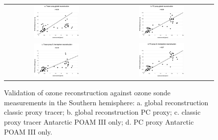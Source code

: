 \begin{figure}
  \centering
  \begin{tabular}{cc}
  \includegraphics[width=0.45\textwidth]{global_classic_sonde_Shemi} &
  \includegraphics[width=0.45\textwidth]{global_PC_sonde_Shemi} \\
  \includegraphics[width=0.45\textwidth]{Shemi_classic_sonde} &
  \includegraphics[width=0.45\textwidth]{Shemi_PC_sonde}
  \end{tabular}
  \caption{Validation of ozone reconstruction against ozone sonde measurements
  in the Southern hemisphere: a. global reconstruction classic proxy tracer; b. global reconstruction PC proxy; c. classic proxy tracer Antarctic POAM III only; d. PC proxy Antarctic POAM III only.}
  \label{Shemi}
\end{figure}

